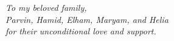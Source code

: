 \textit{To my beloved family,\\
Parvin, Hamid, Elham, Maryam, and Helia \\ 
for their unconditional love and support.}